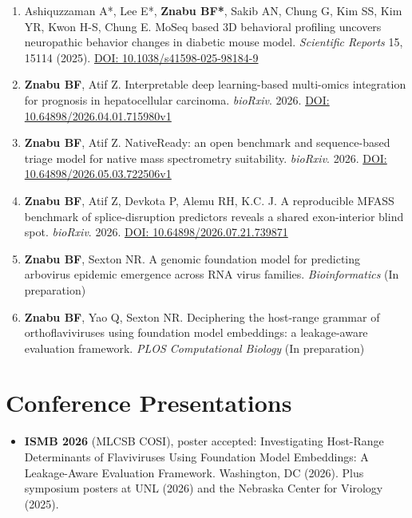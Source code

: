 \documentclass[10pt,a4paper]{article}
\begin{document}
\begin{enumerate}[leftmargin=1.5em, topsep=2pt, itemsep=2pt, parsep=0pt]
  \item Ashiquzzaman A*, Lee E*, \textbf{Znabu BF*}, Sakib AN, Chung G, Kim SS, Kim YR, Kwon H-S, Chung E. MoSeq based 3D behavioral profiling uncovers neuropathic behavior changes in diabetic mouse model. \textit{Scientific Reports} 15, 15114 (2025). \href{https://doi.org/10.1038/s41598-025-98184-9}{DOI: 10.1038/s41598-025-98184-9}

  \item \textbf{Znabu BF}, Atif Z. Interpretable deep learning-based multi-omics integration for prognosis in hepatocellular carcinoma. \textit{bioRxiv}. 2026. \href{https://www.biorxiv.org/content/10.64898/2026.04.01.715980v1}{DOI: 10.64898/2026.04.01.715980v1}

  \item \textbf{Znabu BF}, Atif Z. NativeReady: an open benchmark and sequence-based triage model for native mass spectrometry suitability. \textit{bioRxiv}. 2026. \href{https://www.biorxiv.org/content/10.64898/2026.05.03.722506v1}{DOI: 10.64898/2026.05.03.722506v1}

  \item \textbf{Znabu BF}, Atif Z, Devkota P, Alemu RH, K.C. J. A reproducible MFASS benchmark of splice-disruption predictors reveals a shared exon-interior blind spot. \textit{bioRxiv}. 2026. \href{https://www.biorxiv.org/content/10.64898/2026.07.21.739871v1}{DOI: 10.64898/2026.07.21.739871}

  \item \textbf{Znabu BF}, Sexton NR. A genomic foundation model for predicting arbovirus epidemic emergence across RNA virus families. \textit{Bioinformatics} (In preparation)

  \item \textbf{Znabu BF}, Yao Q, Sexton NR. Deciphering the host-range grammar of orthoflaviviruses using foundation model embeddings: a leakage-aware evaluation framework. \textit{PLOS Computational Biology} (In preparation)
\end{enumerate}

\section{Conference Presentations}

\begin{itemize}[leftmargin=1.2em, topsep=2pt, itemsep=2pt, parsep=0pt]
  \item \textbf{ISMB 2026} (MLCSB COSI), poster accepted: Investigating Host-Range Determinants of Flaviviruses Using Foundation Model Embeddings: A Leakage-Aware Evaluation Framework. Washington, DC (2026). Plus symposium posters at UNL (2026) and the Nebraska Center for Virology (2025).
\end{itemize}
\end{document}
